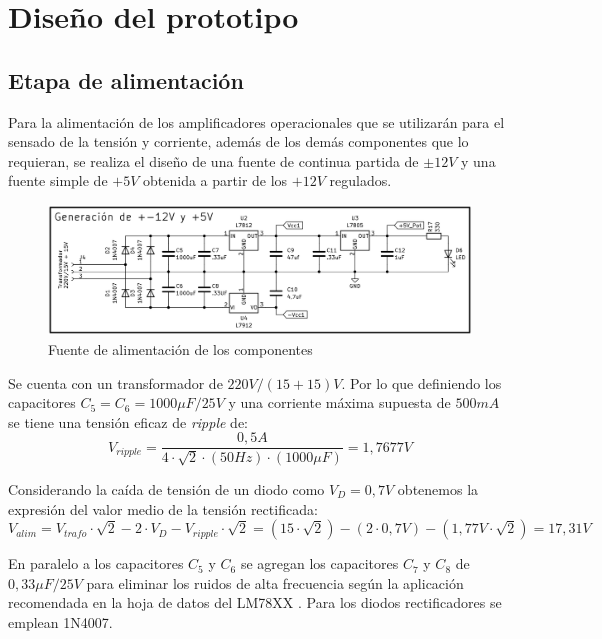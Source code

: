 \chapter{Diseño del prototipo}

\section{Etapa de alimentación} \par
Para la alimentación de los amplificadores operacionales que se utilizarán para el sensado de la tensión y corriente, además de los demás componentes que lo requieran, se realiza el diseño de una fuente de continua partida de $\pm 12V$ y una fuente simple de $+5V$ obtenida a partir de los $+12V$ regulados. \par
\begin{figure} [H]
	\centering
	\includegraphics[width=\textwidth]{./imagenes/Alimentacion_analogica.png}
	\caption{Fuente de alimentación de los componentes}
	\label{F:alimentacion_analogica}
\end{figure} \par 
Se cuenta con un transformador de $220V/(15+15)V$. Por lo que definiendo los capacitores $C_5 =C_6 =1000\mu F/25V$ y una corriente máxima supuesta de $500mA$ se tiene una tensión eficaz de \textit{ripple} de:
\begin{equation}
	V_{ripple} =\frac{0,5A}{4\cdot \sqrt{2}\cdot (50Hz)\cdot (1000\mu F)}=1,7677V
\end{equation} \par
Considerando la caída de tensión de un diodo como $V_D =0,7V$ obtenemos la expresión del valor medio de la tensión rectificada:
\begin{equation}
V_{alim} =V_{trafo} \cdot \sqrt{2}-2\cdot V_D -V_{ripple} \cdot \sqrt{2}=(15\cdot \sqrt{2})-(2\cdot 0,7V)-(1,77V\cdot \sqrt{2})=17,31V
\end{equation} \par
En paralelo a los capacitores $C_5$ y $C_6$ se agregan los capacitores $C_7$ y $C_8$ de $0,33\mu F/25V$ para eliminar los ruidos de alta frecuencia según la aplicación recomendada en la hoja de datos del LM78XX \cite{LM78xx}. Para los diodos rectificadores se emplean 1N4007.\par

